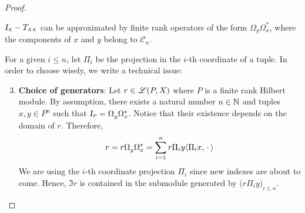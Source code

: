 \begin{lema}
\begin{proof}
\begin{itroman}
    \item \label{item: aproximacao de Id-T_XX} $\sub{\Id}{X}-\sub{T}{X X}$ can be approximated by finite rank operators of the form $\Omega_{y} \Omega_{x}^{*}$, where the components of $x$ and $y$ belong to ${\mathscr C}_n$.
\end{itroman}
For a given $i \leqslant n$, let $\Pi_i$ be the projection in the $i$-th coordinate of a tuple. In order to choose wisely, we write a technical issue:
\begin{enumerate}[label=\ensuremath{(\roman*)}]
    \setcounter{enumi}{2}
    \item \textbf{Choice of generators}: Let $r\in \mathscr L(P,X)$ where $P$ is a finite rank Hilbert module. By assumption, there exists a natural number $n \in \operatorname{\mathbb{N}}$ and tuples $x, y \in P^{n}$ such that $\sub\Id{P} = \Omega^{\vphantom{*}}_{y} \Omega_{x}^*$. Notice that their existence depends on the domain of $r$. Therefore,
\[
r = r\Omega^{\vphantom{*}}_{y} \Omega_{x}^* = \sum_{i=1}^{n} r\Pi_iy\langle {\Pi_ix},{\operatorname{\,\cdot\,}}\rangle
\]
    We are using the $i$-th coordinate projection $\Pi_i$ since new indexes are about to come. Hence, $\Im r$ is contained in the submodule generated by $\big(r\Pi_iy\big)_{i \leq n}$.
\end{enumerate}


\end{proof}
\end{lema}
